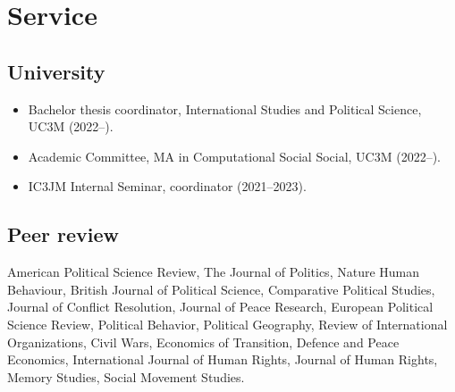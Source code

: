 \documentclass[a4paper, 12pt]{article}
\begin{document}
\section*{Service}

\subsection*{University}

\begin{itemize}[leftmargin=12pt, itemsep=0pt]
  \item Bachelor thesis coordinator, International Studies and Political Science, UC3M (2022--).
	\item Academic Committee, MA in Computational Social Social, UC3M (2022--).
	\item IC3JM Internal Seminar, coordinator (2021--2023).
\end{itemize}

\subsection*{Peer review}

American Political Science Review, The Journal of Politics, Nature Human Behaviour, British Journal of Political Science, Comparative Political Studies, Journal of Conflict Resolution, Journal of Peace Research, European Political Science Review, Political Behavior, Political Geography, Review of International Organizations, Civil Wars, Economics of Transition, Defence and Peace Economics, International Journal of Human Rights, Journal of Human Rights, Memory Studies, Social Movement Studies.


%
\end{document}
